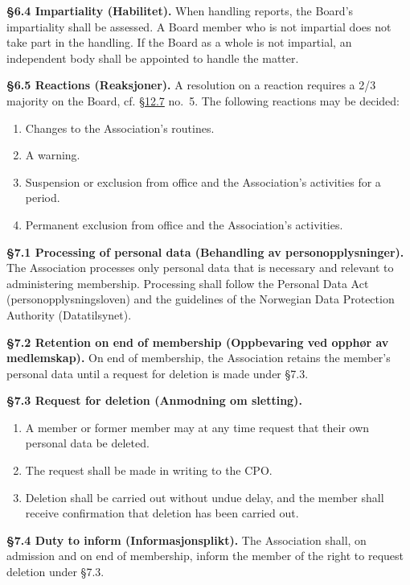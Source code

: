 \documentclass{../../../Common/Latex/Templates/rapport}
\begin{document}
\textbf{\S 6.4 Impartiality (Habilitet).}\label{bylaw:6.4} When handling reports, the Board's impartiality shall be assessed. A Board member who is not impartial does not take part in the handling. If the Board as a whole is not impartial, an independent body shall be appointed to handle the matter.

\textbf{\S 6.5 Reactions (Reaksjoner).}\label{bylaw:6.5} A resolution on a reaction requires a 2/3 majority on the Board, cf. \hyperref[bylaw:12.7]{\S 12.7} no.\ 5. The following reactions may be decided:
\begin{enumerate}
  \item Changes to the Association's routines.
  \item A warning.
  \item Suspension or exclusion from office and the Association's activities for a period.
  \item Permanent exclusion from office and the Association's activities.
\end{enumerate}

\label{bylaw:7}
\textbf{\S 7.1 Processing of personal data (Behandling av personopplysninger).}\label{bylaw:7.1} The Association processes only personal data that is necessary and relevant to administering membership. Processing shall follow the Personal Data Act (personopplysningsloven) and the guidelines of the Norwegian Data Protection Authority (Datatilsynet).

\textbf{\S 7.2 Retention on end of membership (Oppbevaring ved opphør av medlemskap).}\label{bylaw:7.2} On end of membership, the Association retains the member's personal data until a request for deletion is made under \S7.3.

\textbf{\S 7.3 Request for deletion (Anmodning om sletting).}\label{bylaw:7.3}
\begin{enumerate}
  \item A member or former member may at any time request that their own personal data be deleted.
  \item The request shall be made in writing to the CPO.
  \item Deletion shall be carried out without undue delay, and the member shall receive confirmation that deletion has been carried out.
\end{enumerate}

\textbf{\S 7.4 Duty to inform (Informasjonsplikt).}\label{bylaw:7.4} The Association shall, on admission and on end of membership, inform the member of the right to request deletion under \S7.3.
\end{document}
